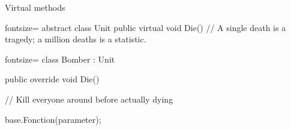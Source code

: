 \begin{frame}[fragile]
\begin{center}{\large Virtual methods}\end{center}
  \begin{csharpcode*}{fontsize=\scriptsize}
abstract class Unit
{
    public virtual void Die()
    {
        // A single death is a tragedy; a million deaths is a statistic.
    }
}
  \end{csharpcode*}
  \pause
  \begin{csharpcode*}{fontsize=\scriptsize}
class Bomber : Unit
{
    public override void Die()
    {
        // Kill everyone around before actually dying

        base.Fonction(parameter);
    }
}
    \end{csharpcode*}
\end{frame}
